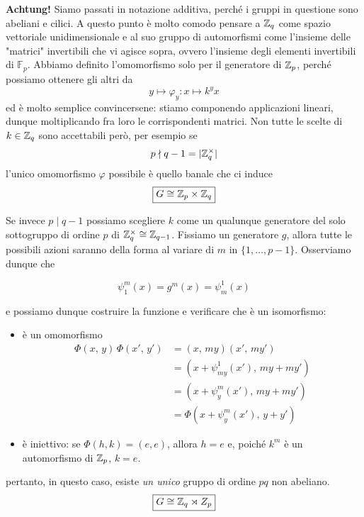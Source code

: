\begin{multicols}{2}
\textbf{Achtung!} Siamo passati in notazione additiva, perché i gruppi in questione sono abeliani e cilici. A questo punto è molto comodo pensare a $ \mathbb{Z}_q $ come spazio vettoriale unidimensionale e al suo gruppo di automorfismi come l'insieme delle "matrici" invertibili che vi agisce sopra, ovvero l'insieme degli elementi invertibili di $ \mathbb{F}_p $. Abbiamo definito l'omomorfismo solo per il generatore di $ \mathbb{Z}_p $, perché possiamo ottenere gli altri da
\[ y \mapsto \varphi_y : x \mapsto k^yx \]
ed è molto semplice convincersene: stiamo componendo applicazioni lineari, dunque moltiplicando fra loro le corrispondenti matrici.
Non tutte le scelte di $ k \in \mathbb{Z}_q $ sono accettabili però, per esempio se 
$$  p \nmid q-1 = |\mathbb{Z}_q^\times| $$
l'unico omomorfismo $ \varphi $ possibile è quello banale che ci induce
\[ \boxed{G \cong \mathbb{Z}_p \times \mathbb{Z}_q} \]

Se invece 
$ p \mid q -1 $
possiamo scegliere $ k $ come un qualunque generatore del solo sottogruppo di ordine $ p $ di $ \mathbb{Z}_q^\times \cong \mathbb{Z}_{q-1} $. Fissiamo un generatore $ g $, allora tutte le possibili azioni saranno della forma 
al variare di $ m $ in $ \{1, \dots, p-1\} $.
Osserviamo dunque che

\[ \psi^m_1(x) = g^{m}(x) = \psi^1_m(x) \]


e possiamo dunque costruire la funzione
e verificare che è un isomorfismo:
\begin{itemize}
	\item è un omomorfismo
	\begin{align*} \Phi(x,\, y)\,\Phi(x',\, y') &= (x,\, my)(x',\, my') \\&= (x + \psi_{my}^1(x'), \,my + my')
	\\&= (x + \psi_y^{m}(x'),\, my + my') \\&= \Phi(x + \psi^m_y(x'),\, y + y')  \end{align*} 
	\item è iniettivo: se $ \Phi(h, k) = (e, e) $, allora $ h = e $ e, poiché $ k^m $ è un automorfismo di $ \mathbb{Z}_p $, $ k = e $.
\end{itemize}
pertanto, in questo caso, esiste \emph{un unico} gruppo di ordine $ pq $ non abeliano. 
\[ \boxed{G \cong \mathbb{Z}_q \rtimes Z_p} \]



\end{multicols}

